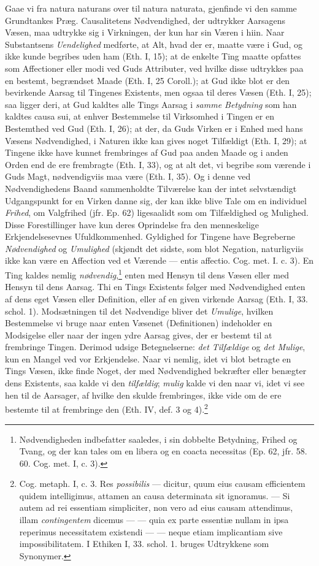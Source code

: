 \documentclass[12pt,a4paper]{book}
\newcommand{\opage}[1]{\marginnote{\footnotesize\textit{[#1]}}}
\begin{document}
Gaae vi fra natura naturans over til natura naturata, gjenfinde
vi den samme Grundtankes Præg. Causalitetens Nødvendighed, der
udtrykker Aarsagens Væsen, maa udtrykke sig i Virkningen, der kun
har sin Væren i hiin. Naar Substantsens \emph{Uendelighed} medførte, at
Alt, hvad der er, maatte være i Gud, og ikke kunde begribes uden
ham (Eth. I, 15); at de enkelte Ting maatte opfattes som
Affectioner eller modi ved Guds Attributer, ved hvilke disse
udtrykkes paa en bestemt, begrændset Maade (Eth. I, 25 Coroll.);
at Gud ikke blot er den bevirkende Aarsag til Tingenes Existents,
men ogsaa til deres Væsen (Eth. I, 25); saa ligger deri, at Gud
kaldtes alle Tings Aarsag i \emph{samme Betydning} som han kaldtes causa
sui, at enhver Bestemmelse til Virksomhed i Tingen er en
Bestemthed ved Gud (Eth. I, 26); at der, da Guds Virken er i
Enhed med hans Væsens Nødvendighed, i Naturen ikke kan gives
noget Tilfældigt (Eth. I, 29); at Tingene ikke have kunnet
frembringes af Gud paa anden Maade og i anden Orden end de ere
frembragte (Eth. I, 33), og at alt det, vi begribe som værende i
Guds Magt, nødvendigviis maa være (Eth. I, 35). Og i denne ved
Nødvendighedens Baand sammenholdte Tilværelse kan der intet
selvstændigt Udgangspunkt for en Virken danne sig, der kan ikke
blive Tale om en individuel \emph{Frihed}, om Valgfrihed (jfr. Ep. 62)
ligesaalidt som om Tilfældighed og Mulighed. Disse Forestillinger
have kun deres Oprindelse fra den menneskelige Erkjendelsesevnes
Ufuldkommenhed. Gyldighed for Tingene have Begreberne
\emph{Nødvendighed} og \emph{Umulighed} (skjøndt det sidste, som blot Negation,
naturligviis ikke kan være en Affection ved et Værende --- entis
affectio. Cog. met. I. c. 3). En Ting kaldes
\opage{69} \setcounter{footnote}{0}%
nemlig \emph{nødvendig},\footnote{Nødvendigheden indbefatter saaledes, i
sin dobbelte Betydning, Frihed og Tvang, og der kan tales om en
libera og en coacta necessitas (Ep. 62, jfr. 58. 60. Cog. met. I,
c. 3).} enten med Hensyn til dens Væsen eller med Hensyn til dens
Aarsag. Thi en Tings Existents følger med Nødvendighed enten af
dens eget Væsen eller Definition, eller af en given virkende
Aarsag (Eth. I, 33. schol. 1). Modsætningen til det Nødvendige
bliver det \emph{Umulige}, hvilken Bestemmelse vi bruge naar enten
Væsenet (Definitionen) indeholder en Modsigelse eller naar der
ingen ydre Aarsag gives, der er bestemt til at frembringe Tingen.
Derimod udsige Betegnelserne: \emph{det Tilfældige} og \emph{det Mulige}, kun en
Mangel ved vor Erkjendelse. Naar vi nemlig, idet vi blot betragte
en Tings Væsen, ikke finde Noget, der med Nødvendighed bekræfter
eller benægter dens Existents, saa kalde vi den \emph{tilfældig}; \emph{mulig}
kalde vi den naar vi, idet vi see hen til de Aarsager, af hvilke
den skulde frembringes, ikke vide om de ere bestemte til at
frembringe den (Eth. IV, def. 3 og 4).\footnote{Cog. metaph. I,
c. 3. Res \textit{possibilis} --- dicitur, quum eius causam efficientem
quidem intelligimus, attamen an causa determinata sit ignoramus.
--- Si autem ad rei essentiam simpliciter, non vero ad eius
causam attendimus, illam \emph{contingentem} dicemus --- --- quia ex
parte essentiæ nullam in ipsa reperimus necessitatem existendi
--- --- neque etiam implicantiam sive impossibilitatem. I Ethiken
I, 33. schol. 1. bruges Udtrykkene som Synonymer.}
\end{document}
